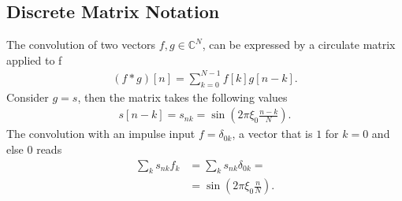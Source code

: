 \documentclass[a4paper]{article}
\begin{document}
\subsection{Discrete Matrix Notation}
The convolution of two vectors $f, g \in \mathbb{C}^N$, can be expressed by a
circulate matrix applied to f
\begin{align}
    (f * g) [n] = \sum_{k=0}^{N-1} f[k] g[n-k].
\end{align}
Consider $g=s$, then the matrix takes the following values
\begin{align}
    s[n-k] = s_{nk} = \sin\left(2\pi \xi_0 \frac{n-k}{N}\right).
\end{align}
The convolution with an impulse input $f=\delta_{0k}$, a vector that is $1$
for $k=0$ and else 0 reads
\begin{align}
    \sum_k s_{nk}f_k &= \sum_k s_{nk} \delta_{0k} =\\
            &= \sin\left(2\pi \xi_0 \frac{n}{N}\right).
\end{align}

\end{document}
